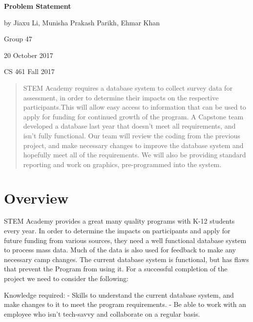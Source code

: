 \documentclass[onecolumn, draftclsnofoot,10pt, compsoc]{IEEEtran}
\begin{document}
\begin{titlepage}
		
		\begin{center}
		\bigbreak	
		\textbf{Problem Statement}
	
  	by Jiaxu Li, Munisha Prakash Parikh, Ehmar Khan

  	  Group 47

  	  20 October 2017
   
		 CS 461 Fall 2017
    
   		\end{center}
        \begin{abstract}
        STEM Academy requires a database system to collect survey data for assessment, in order to determine their impacts on the respective participants.This will allow easy access to information that can be used to apply for funding for continued growth of the program. A Capstone team developed a database last year that doesn't meet all requirements, and isn't fully functional. Our team will review the coding from the previous project, and make necessary changes to improve the database system and hopefully meet all of the requirements. We will also be providing standard reporting and work on graphics, pre-programmed into the system.
        \end{abstract}     
\end{titlepage}
\newpage
{}
\tableofcontents
\clearpage

\section{Overview}
STEM Academy provides a great many quality programs with K-12 students every year. In order to determine the impacts on participants and apply for future funding from various sources, they need a well functional database system to process mass data. Much of the data is also used for feedback to make any necessary camp changes. The current database system is functional, but has flaws that prevent the Program from using it. For a successful completion of the project we need to consider the following:
\newline \newline

Knowledge required: \newline
- Skills to understand the current database system, and make changes to it to meet the program requirements. \newline
- Be able to work with an employee who isn\rq t tech-savvy and collaborate on a regular basis.\newline\newline
\end{document}
